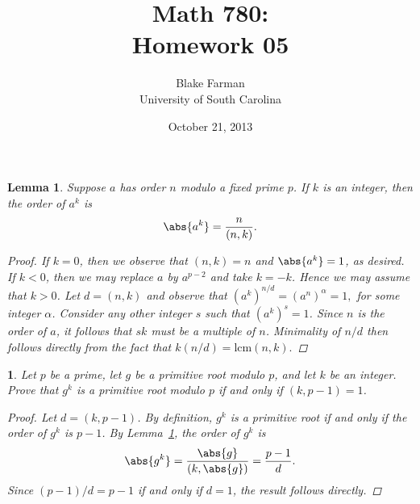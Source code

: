 \documentclass[10pt]{amsart}
\author{Blake Farman\\University of South Carolina}
\title{Math 780:\\Homework 05}
\date{October 21, 2013}
\begin{document}
\maketitle

\providecommand{\p}{\mathfrak{p}}
\providecommand{\m}{\mathfrak{m}}

\newtheorem{thm}{}
\newtheorem{lem}{Lemma}

\begin{lem}\label{lem1}
  Suppose $a$ has order $n$ modulo a fixed prime $p$.
  If $k$ is an integer, then the order of $a^k$ is 
  $$\abs{a^k} = \frac{n}{(n,k)}.$$
  
  \begin{proof}
    If $k = 0$, then we observe that $(n,k) = n$ and $\abs{a^k} = 1$, as desired.
    If $k < 0$, then we may replace $a$ by $a^{p-2}$ and take $k = -k$.
    Hence we may assume that $k > 0$.
    Let $d = (n,k)$ and observe that $(a^k)^{n/d} = (a^n)^\alpha = 1,$ for some integer $\alpha$.
    Consider any other integer $s$ such that $(a^k)^s = 1$.
    Since $n$ is the order of $a$, it follows that $sk$ must be a multiple of $n$.
    Minimality of $n/d$ then follows directly from the fact that $k(n/d) = \text{lcm}(n,k).$
  \end{proof}
\end{lem}

\begin{thm}\label{ex1}
  Let $p$ be a prime, let $g$ be a primitive root modulo $p$, and let $k$ be an integer.
  Prove that $g^k$ is a primitive root modulo $p$ if and only if $(k,p-1) = 1$.
  
  \begin{proof}
    Let $d = (k, p-1)$.
    By definition, $g^k$ is a primitive root if and only if the order of $g^k$ is $p-1$.
    By Lemma~\ref{lem1}, the order of $g^k$ is 
    $$\abs{g^k} = \frac{\abs{g}}{(k, \abs{g})} = \frac{p-1}{d}.$$
    Since $(p-1)/d = p-1$ if and only if $d = 1$, the result follows directly.
    
  \end{proof}
\end{thm}
\end{document}
